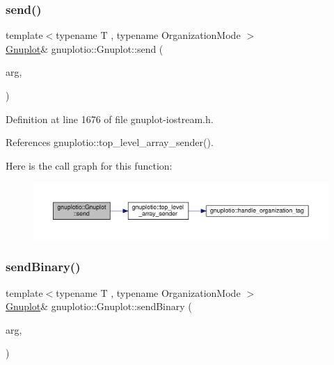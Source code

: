 \mbox{\label{classgnuplotio_1_1_gnuplot_ae3f4c07960aa5601cc72158be67f945c}} 
\subsubsection{\texorpdfstring{send()}{send()}}
{\footnotesize\ttfamily template$<$typename T , typename Organization\+Mode $>$ \\
\hyperlink{classgnuplotio_1_1_gnuplot}{Gnuplot}\& gnuplotio\+::\+Gnuplot\+::send (\begin{DoxyParamCaption}\item[{const T \&}]{arg,  }\item[{Organization\+Mode}]{ }\end{DoxyParamCaption})\hspace{0.3cm}{\ttfamily [inline]}}



Definition at line 1676 of file gnuplot-\/iostream.\+h.



References gnuplotio\+::top\+\_\+level\+\_\+array\+\_\+sender().

Here is the call graph for this function\+:\nopagebreak
\begin{figure}[H]
\begin{center}
\leavevmode
\includegraphics[width=350pt]{classgnuplotio_1_1_gnuplot_ae3f4c07960aa5601cc72158be67f945c_cgraph}
\end{center}
\end{figure}
\mbox{\label{classgnuplotio_1_1_gnuplot_a46c9e01d2030768cd811d2e8dbd10dfa}} 
\subsubsection{\texorpdfstring{send\+Binary()}{sendBinary()}}
{\footnotesize\ttfamily template$<$typename T , typename Organization\+Mode $>$ \\
\hyperlink{classgnuplotio_1_1_gnuplot}{Gnuplot}\& gnuplotio\+::\+Gnuplot\+::send\+Binary (\begin{DoxyParamCaption}\item[{const T \&}]{arg,  }\item[{Organization\+Mode}]{ }\end{DoxyParamCaption})\hspace{0.3cm}{\ttfamily [inline]}}




